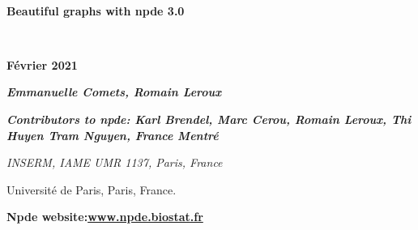 \documentclass{report}
\begin{document}
\thispagestyle{empty}




\pagestyle{fancy}
\renewcommand{\headrulewidth}{0pt}
\renewcommand{\footrulewidth}{1pt}
\renewcommand{\thesection}{\arabic{section}}
\lhead{}
\chead{}
\rhead{}
\rfoot{\thepage}

\renewenvironment{Schunk}{\vspace{\topsep}}{\vspace{\topsep}}

\parindent 18pt
$\phantom{minime}$

\begin{figure}[htp] 
\captionsetup[subfigure]{labelformat=empty}

\centering
{}%
\hfill%
%
\end{figure}


\begin{center}
{\setlength{\baselineskip}{2\baselineskip}
{\Large \bfseries Beautiful graphs with npde 3.0}

\parindent 18pt
$\phantom{minime}$

{\Large \bfseries F\'evrier 2021}

\bigskip

{\Large \itshape \bfseries Emmanuelle Comets, Romain Leroux}

\bigskip

\bigskip

{\large \itshape \bfseries Contributors to npde: Karl Brendel, Marc Cerou, Romain Leroux, Thi Huyen Tram Nguyen, France Mentr\'e}

\bigskip
{\it
INSERM, IAME UMR 1137, Paris, France

Universit\'e de Paris, Paris, France.
}
\par}
\end{center}

\vskip 2.5cm
\begin{center}
\large \bfseries{Npde website}:\url{www.npde.biostat.fr}
\end{center}
\end{document}
